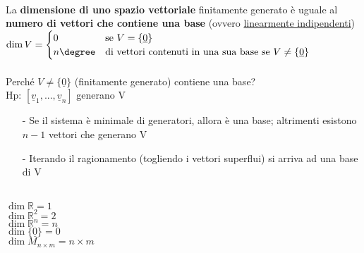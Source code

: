   \begin{proposizione}
    \phantom{}\\
    La \textbf{dimensione di uno spazio vettoriale} finitamente
    generato è uguale al \textbf{numero di vettori che contiene una
    base} (ovvero \underline{linearmente indipendenti})\\
    $
    \dim V=
    \begin{cases}
      0 & \text{se } V=\{\underline{0}\}\\
      n\degree & \text{di vettori contenuti in una sua base se }
      V\neq \{\underline{0}\}
    \end{cases}
    $\\\\
    Perché $V\neq\{\underline{0}\}$ (finitamente generato) contiene una base?\\
    Hp: $[\underline{v}_1,...,\underline{v}_n]$ generano V
    \begin{itemize}
      \item[-] Se il sistema è minimale di generatori, allora è una
        base; altrimenti esistono $n-1$ vettori che generano V
      \item[-] Iterando il ragionamento (togliendo i vettori
        superflui) si arriva ad una base di V
    \end{itemize}
    \begin{es}
      \phantom{}\\
      $\dim\mathbb{R}=1$\\
      $\dim\mathbb{R}^2=2$\\
      $\dim\mathbb{R}^n=n$\\
      $\dim\{\underline{0}\}=0$\\
      $\dim M_{n\times m}=n\times m$
    \end{es}
  \end{proposizione}

